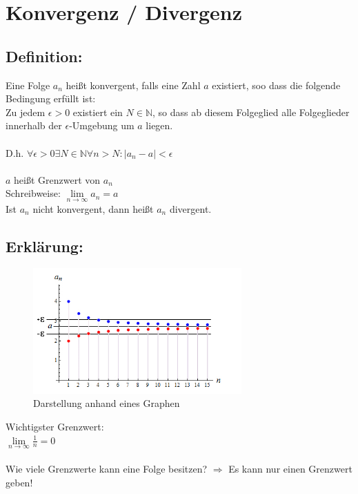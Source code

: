 \documentclass[../mainfile.tex]{article}
\begin{document}
\section{Konvergenz / Divergenz}
\subsection{Definition:}

Eine Folge $a_{n}$ heißt konvergent, falls eine Zahl $a$ existiert, soo dass die folgende Bedingung erfüllt ist:\\
Zu jedem $\epsilon > 0$ existiert ein $N \in \mathbb{N}$, so dass ab diesem Folgeglied alle Folgeglieder innerhalb der $\epsilon$-Umgebung um $a$ liegen.\\
\quad\\
D.h. $\forall \epsilon > 0 \exists N \in \mathbb{N} \forall n > N: |a_{n}-a| < \epsilon$\\
\quad\\
$a$ heißt Grenzwert von $a_{n}$\\
Schreibweise: $\lim\limits_{n \rightarrow \infty}{a_{n}} = a$\\
Ist $a_{n}$ nicht konvergent, dann heißt $a_{n}$ divergent.

\subsection{Erklärung:}
\FloatBarrier
\begin{figure}[!htbp] 
\centering
\includegraphics[width=8cm]{./swahl/img/konvergenzGraph.jpg}
\caption{Darstellung anhand eines Graphen}
\end{figure}
\FloatBarrier

Wichtigster Grenzwert:\\
$\lim\limits_{n \rightarrow \infty}{\frac{1}{n}} = 0$\\
\quad\\
Wie viele Grenzwerte kann eine Folge besitzen? $\Rightarrow$ Es kann nur einen Grenzwert geben! 
	
\end{document}
